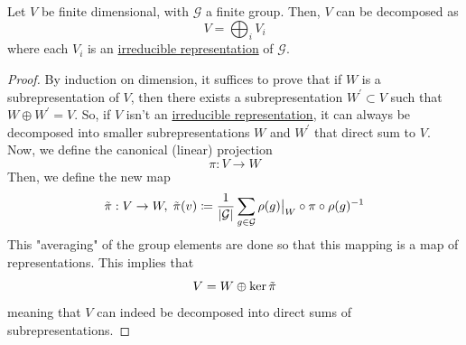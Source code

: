   \begin{theorem}
    \label{thm:maschkes-theorem}
    Let $V$ be finite dimensional, with $\mathcal{G}$ a finite group. Then, $V$ can be decomposed as 
    \begin{equation}
      V = \bigoplus_{i} V_i
    \end{equation}
    where each $V_i$ is an \hyperref[def:irreducible-representation]{irreducible representation} of $\mathcal{G}$. 
  \end{theorem}
  \begin{proof}
    By induction on dimension, it suffices to prove that if $W$ is a subrepresentation of $V$, then there exists a subrepresentation $W^\prime \subset V$ such that $W \oplus W^\prime = V$. So, if $V$ isn't an \hyperref[def:irreducible-representation]{irreducible representation}, it can always be decomposed into smaller subrepresentations $W$ and $W^\prime$ that direct sum to $V$. Now, we define the canonical (linear) projection 
    \begin{equation}
      \pi: V \to W
    \end{equation}
    Then, we define the new map 
    \begin{equation}
      \Tilde{\pi}: V \to W, \; \Tilde{\pi}(v) \coloneqq \frac{1}{|\mathcal{G}|} \sum_{g \in \mathcal{G}} \rho(g)\big|_W \circ \pi \circ \rho(g)^{-1}
    \end{equation}
    This "averaging" of the group elements are done so that this mapping is a map of representations. This implies that 
    \begin{equation}
      V = W \oplus \ker{\Tilde{\pi}}
    \end{equation}
    meaning that $V$ can indeed be decomposed into direct sums of subrepresentations. 
  \end{proof}

